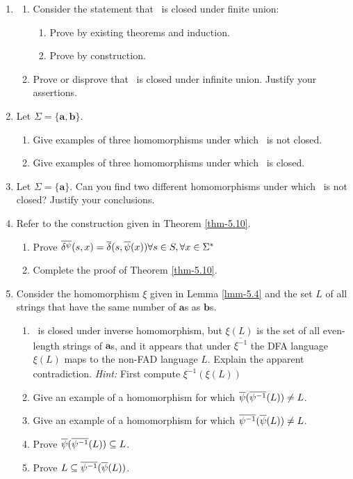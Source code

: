 \begin{enumerate}[{5.}1. ]
\item \begin{enumerate}
\item Consider the statement that \DSIG\ is closed under finite union:
\begin{enumerate}
\item Prove by existing theorems and induction.
\item Prove by construction.
\end{enumerate}
\item Prove or disprove that \DSIG\ is closed under infinite union. Justify your
assertions.
\end{enumerate}

\item Let $\Sigma =\{\pmb{a},\pmb{b}\}$.
\begin{enumerate}
\item Give examples of three homomorphisms under which \NSIG\ is not closed.
\item Give examples of three homomorphisms under which \NSIG\ is closed.
\end{enumerate}

\item Let $\Sigma =\{\pmb{a}\}$. Can you find two different homomorphisms under
which \NSIG\ is not closed? Justify your conclusions.

\item Refer to the construction given in Theorem \ref{thm-5.10}.
\begin{enumerate}
\item Prove $\overline{\delta^{\psi}} (s,x)=\overline{\delta}(s,\overline{\psi}(x)) \forall s \in S,\forall x \in
	\Sigma^*$
\item Complete the proof of Theorem \ref{thm-5.10}.
\end{enumerate}

\item Consider the homomorphism $\xi$ given in Lemma \ref{lmm-5.4} and the set $L$ of all
strings that have the same number of $\pmb{a}$s as $\pmb{b}$s.
\begin{enumerate}
\item \DSIG\ is closed under inverse homomorphism, but $\xi(L)$ is the set of
all even-length strings of $\pmb{a}$s, and it appears that under
$\overline{\xi^{-1}}$ the DFA language $\xi(L)$ maps to the non-FAD language $L$.
Explain the apparent contradiction. \emph{Hint:} First compute
$\overline{\xi^{-1}}(\xi(L))$
\item Give an example of a homomorphism for which $\overline{\psi}(\overline{\psi^{-1}}(L)) \not= L$.
\item Give an example of a homomorphism for which $\overline{\psi^{-1}}(\overline{\psi}(L)) \not= L$.
\item Prove $\overline{\psi}(\overline{\psi^{-1}}(L)) \subseteq L$.
\item Prove $L \subseteq \overline{\psi^{-1}}(\overline{\psi}(L))$.
\end{enumerate}


\end{enumerate}
